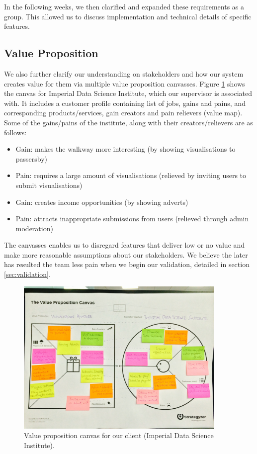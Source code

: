 \documentclass[a4paper]{article}
\begin{document}
In the following weeks, we then clarified and expanded these requirements as 
a group. This allowed us to discuss implementation and technical details
of specific features.

\subsection{Value Proposition}
We also further clarify our understanding on stakeholders and how our system
creates value for them via multiple value proposition canvasses. Figure
\ref{fig:valpropcanvas} shows the canvas for Imperial Data Science Institute,
which our supervisor is associated with. It includes a customer profile
containing list of jobs, gains and pains, and corresponding products/services,
gain creators and pain relievers (value map). Some of the gains/pains
of the institute, along with their creators/relievers are as follows:

\begin{itemize}
  \item Gain: makes the walkway more interesting
        (by showing visualisations to passersby)
  \item Pain: requires a large amount of visualisations
        (relieved by inviting users to submit visualisations)
  \item Gain: creates income opportunities
        (by showing adverts)
  \item Pain: attracts inappropriate submissions from users
        (relieved through admin moderation)
\end{itemize}

The canvasses enables us to disregard features that deliver low or no value
and make more reasonable assumptions about our stakeholders. We believe the
later has resulted the team less pain when we begin our validation, detailed
in section \ref{sec:validation}.

\begin{figure}[H]
   \begin{center}
      \includegraphics[width = 0.9\textwidth, trim = 1cm 6.5cm 1cm 4.5cm, clip]{./evaluation/value_prop_canvas.jpg}
   \end{center}
   \caption{Value proposition canvas for our client (Imperial Data
            Science Institute).}
   \label{fig:valpropcanvas}
\end{figure}
\end{document}
